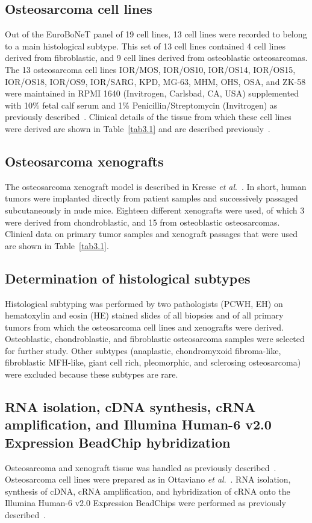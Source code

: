\subsection{Osteosarcoma cell lines}
Out of the EuroBoNeT panel of 19 cell lines, 13 cell
lines were recorded to belong to a main histological
subtype. This set of 13 cell lines contained 4 cell lines
derived from fibroblastic, and 9 cell lines derived from
osteoblastic osteosarcomas. The 13 osteosarcoma cell
lines IOR/MOS, IOR/OS10, IOR/OS14, IOR/OS15,
IOR/OS18, IOR/OS9, IOR/SARG, KPD, MG-63, MHM,
OHS, OSA, and ZK-58 were maintained in RPMI 1640
(Invitrogen, Carlsbad, CA, USA) supplemented with 10\%
fetal calf serum and 1\% Penicillin/Streptomycin (Invitrogen)
as previously described~\cite{ottaviano2010molecular}. Clinical details of the
tissue from which these cell lines were derived are
shown in Table~\ref{tab3.1} and are described previously~\cite{ottaviano2010molecular}.

\subsection{Osteosarcoma xenografts}
The osteosarcoma xenograft model is described in
Kresse {\it et al}.~\cite{kresse2011preclinical}. In short, human tumors were
implanted directly from patient samples and successively
passaged subcutaneously in nude mice. Eighteen different
xenografts were used, of which 3 were derived from
chondroblastic, and 15 from osteoblastic osteosarcomas.
Clinical data on primary tumor samples and xenograft
passages that were used are shown in Table~\ref{tab3.1}.

\subsection{Determination of histological subtypes}
Histological subtyping was performed by two pathologists
(PCWH, EH) on hematoxylin and eosin (HE)
stained slides of all biopsies and of all primary tumors
from which the osteosarcoma cell lines and xenografts
were derived. Osteoblastic, chondroblastic, and fibroblastic
osteosarcoma samples were selected for further
study. Other subtypes (anaplastic, chondromyxoid
fibroma\hyp{}like, fibroblastic MFH-like, giant cell rich, pleomorphic,
and sclerosing osteosarcoma) were excluded
because these subtypes are rare.

\subsection{RNA isolation, cDNA synthesis, cRNA amplification, and Illumina Human-6 v2.0 Expression BeadChip hybridization}
Osteosarcoma and xenograft tissue was handled as previously
described~\cite{buddingh2011tumor}. Osteosarcoma cell lines were prepared
as in Ottaviano {\it et al}.~\cite{ottaviano2010molecular}. RNA isolation,
synthesis of cDNA, cRNA amplification, and hybridization
of cRNA onto the Illumina Human-6 v2.0 Expression
BeadChips were performed as previously described~\cite{buddingh2011tumor}.

